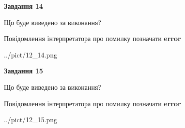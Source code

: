 \documentclass[11pt, ukrainian]{article}
\begin{document}
{\begin {large}
{\begin {center}\textbf{Завдання 14}\end {center}}\par
Що буде виведено за виконання? \par
Повідомлення інтерпретатора про помилку позначати \textbf{error}

\begin{center}
	{../pict/12_14.png}
\end{center}
\newpage

{\begin {center}\textbf{Завдання 15}\end {center}}\par
Що буде виведено за виконання? \par
Повідомлення інтерпретатора про помилку позначати \textbf{error}

\begin{center}
	{../pict/12_15.png}
\end{center}
\newpage

\end {large}}
\end{document}
